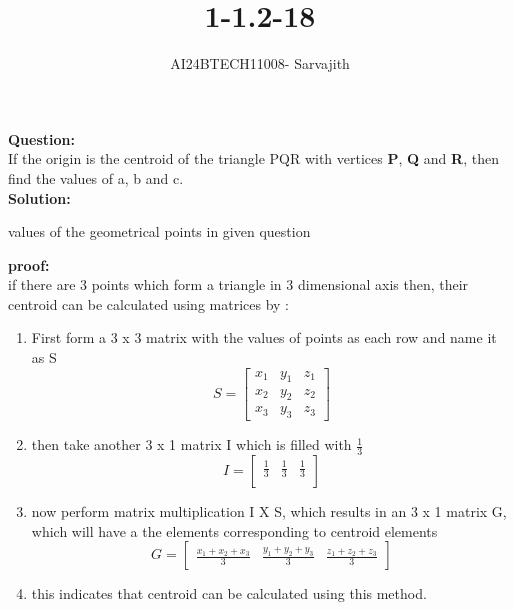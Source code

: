 \documentclass[journal]{IEEEtran}
\begin{document}

\vspace{3cm}

\title{1-1.2-18}
\author{AI24BTECH11008- Sarvajith
}
{\let\newpage\relax\maketitle}

\renewcommand{\thefigure}{\theenumi}
\renewcommand{\thetable}{\theenumi}
\setlength{\intextsep}{10pt} %


\renewcommand{\thetable}{\theenumi}
\textbf{Question: }\\
If the origin is the centroid of the triangle PQR with vertices
\textbf{P}, \textbf{Q} and \textbf{R}, then find the values of a, b and
c.\\
\textbf{Solution: }\\
\begin{table}[h!]    
\centering

\caption{values of the geometrical points in given question}
\label{tab1-1.2-18-1}
\end{table}
\textbf{proof: }\\
if there are 3 points which form a triangle in 3 dimensional axis then, their centroid can be calculated using matrices by : \\
\begin{enumerate} [1.]
    \item First form a 3 x 3 matrix with the values of points as each row and name it as S\\
    $$ S = \begin{bmatrix}
            x_1&y_1&z_1\\
            x_2&y_2&z_2\\
            x_3&y_3&z_3
           \end{bmatrix}$$
    \item then take another 3 x 1 matrix I which is filled with  $\frac{1}{3}$\\
            $$ I = \begin{bmatrix}
         \frac{1}{3}&\frac{1}{3}&\frac{1}{3}\\
              \end{bmatrix}$$
   \item now perform matrix multiplication I X S, which results in an 3 x 1 matrix G, which will have a the elements corresponding to centroid elements \\
     $$G= \begin{bmatrix}
          \frac{x_1+x_2+x_3}{3}&\frac{y_1+y_2+y_3}{3}&\frac{z_1+z_2+z_3}{3}
         \end{bmatrix}$$
     \item this indicates that centroid can be calculated using this method.
														        
\end{enumerate}
\end{document}
